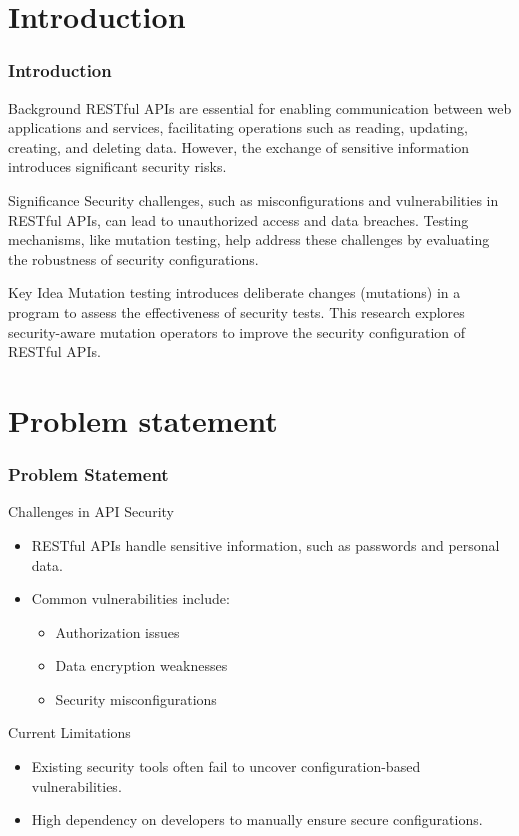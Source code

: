 \documentclass[12pt]{beamer}
\theoremstyle{remark}
\theoremstyle{definition}
\begin{document}
\section{Introduction}
\begin{frame}[allowframebreaks]
\frametitle{Introduction}
\begin{block}{Background}
RESTful APIs are essential for enabling communication between web applications and services, facilitating operations such as reading, updating, creating, and deleting data. However, the exchange of sensitive information introduces significant security risks.
\end{block}

\begin{block}{Significance}
Security challenges, such as misconfigurations and vulnerabilities in RESTful APIs, can lead to unauthorized access and data breaches. Testing mechanisms, like mutation testing, help address these challenges by evaluating the robustness of security configurations.
\end{block}

\begin{block}{Key Idea}
Mutation testing introduces deliberate changes (mutations) in a program to assess the effectiveness of security tests. This research explores security-aware mutation operators to improve the security configuration of RESTful APIs.
\end{block}
\end{frame}

\section{Problem statement}


\begin{frame}[allowframebreaks]
\frametitle{Problem Statement}
\begin{block}{Challenges in API Security}
\begin{itemize}
    \item RESTful APIs handle sensitive information, such as passwords and personal data.
    \item Common vulnerabilities include:
    \begin{itemize}
        \item Authorization issues
        \item Data encryption weaknesses
        \item Security misconfigurations
    \end{itemize}
\end{itemize}
\end{block}

\begin{block}{Current Limitations}
\begin{itemize}
    \item Existing security tools often fail to uncover configuration-based vulnerabilities.
    \item High dependency on developers to manually ensure secure configurations.
\end{itemize}
\end{block}
\end{frame}
\end{document}
